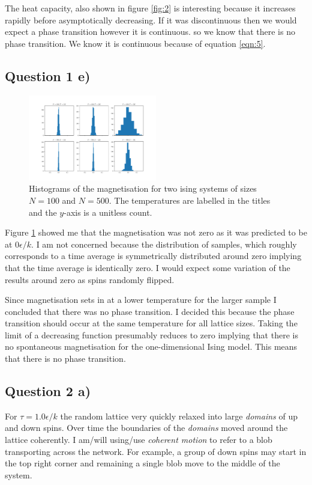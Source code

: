 \documentclass[a4paper, twocolumn]{article}
\begin{document}
The heat capacity, also shown %
in figure \ref{fig:2} is interesting because it increases %
rapidly before asymptotically decreasing. If it was discontinuous %
then we would expect a phase transition however it is continuous. %
so we know that there is no phase transition. We know it is continuous %
because of equation \ref{eqn:5}. 


\subsection*{Question 1 e)}
\begin{figure}[h]
    \centering
    \includegraphics[width=0.5\textwidth]{pub/figures/magnetisation_ising_1d.pdf}
    \caption{Histograms of the magnetisation for two ising %
        systems of sizes \(N = 100\) and \(N = 500\). The %
        temperatures are labelled in the titles and the %
        \(y\)-axis is a unitless count.}
    \label{fig:3}
\end{figure}


Figure \ref{fig:3} showed me that the magnetisation was not zero %
as it was predicted to be at \(0 \epsilon / k\). I am not concerned %
because the distribution of samples, which roughly corresponds to %
a time average is symmetrically distributed around zero implying %
that the time average is identically zero. I would expect some %
variation of the results around zero as spins randomly flipped. %


Since magnetisation sets in at a lower temperature for the larger %
sample I concluded that there was no phase transition. I %
decided this because the phase transition should occur at the %
same temperature for all lattice sizes. Taking the limit of %
a decreasing function presumably reduces to zero implying that %
there is no spontaneous magnetisation for the one-dimensional %
Ising model. This means that there is no phase transition. 


\subsection*{Question 2 a)}
For \(\tau = 1.0 \epsilon / k\) the random lattice very quickly %
relaxed into large \emph{domains} of up and down spins. Over time %
the boundaries of the \emph{domains} moved around the lattice %
coherently. I am/will using/use \emph{coherent motion} to refer %
to a blob transporting across the network. For example, a group %
of down spins may start in the top right corner and remaining %
a single blob move to the middle of the system. 
\end{document}
